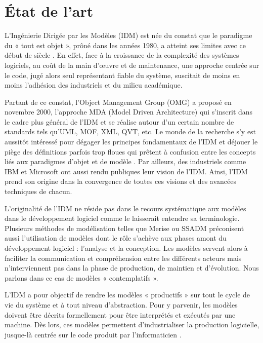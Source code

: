\chapter{État de l'art}
\label{chap:Etat de l'art}

L'Ingénierie Dirigée par les Modèles (IDM) est née du constat que le paradigme du « tout est objet », prôné dans les années 1980, a atteint ses limites avec ce début de siècle \cite{greenfield2004software}. En effet, face à la croissance de la complexité des systèmes logiciels, au coût de la main d'œuvre et de maintenance, une approche centrée sur le code, jugé alors seul représentant fiable du système, suscitait de moins en moins l'adhésion des industriels et du milieu académique. 

Partant de ce constat, l'Object Management Group (OMG) a proposé en novembre 2000, l'approche MDA (Model Driven Architecture) qui s'inscrit dans le cadre plus général de l'IDM et se réalise autour d'un certain nombre de standards tels qu'UML, MOF, XML, QVT, etc. Le monde de la recherche s'y est aussitôt intéressé pour dégager les principes fondamentaux de l'IDM \cite{bezivin2001towards}\cite{kent2002model} \cite{de2002using} et déjouer le piège des définitions parfois trop floues qui prêtent à confusion entre les concepts liés aux paradigmes d'objet et de modèle \cite{bezivin2004search}. Par ailleurs, des industriels comme IBM \cite{booch2004mda} et Microsoft \cite{greenfield2004software} ont aussi rendu publiques leur vision de l'IDM. Ainsi, l'IDM prend son origine dans la convergence de toutes ces visions et des avancées techniques de chacun.

L'originalité de l'IDM ne réside pas dans le recours systématique aux modèles dans le développement logiciel comme le laisserait entendre sa terminologie\cite{bezivin2004rapport}. Plusieurs méthodes de modélisation telles que Merise ou SSADM préconisent aussi l'utilisation de modèles dont le rôle s'achève aux phases amont du développement logiciel : l'analyse et la conception. Les modèles servent alors à faciliter la communication et compréhension entre les différents acteurs mais n'interviennent pas dans la phase de production, de maintien et d'évolution. Nous parlons dans ce cas de modèles « contemplatifs ». 

L'IDM a pour objectif de rendre les modèles « productifs » sur tout le cycle de vie du système et à tout niveau d'abstraction. Pour y parvenir, les modèles doivent être décrits formellement pour être interprétés et exécutés par une machine. Dès lors, ces modèles permettent d'industrialiser la production logicielle, jusque-là centrée sur le code produit par l'informaticien \cite{bezivin2005unification}.

